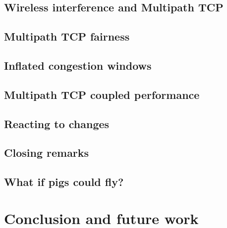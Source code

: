 \documentclass[12pt,a4paper]{article}
\begin{document}
\subsection{Wireless interference and Multipath TCP}
\label{sec:results-mptcp}

\FloatBarrier
\clearpage
\subsection{Multipath TCP fairness}
\label{sec:results-fairness}

\FloatBarrier
\clearpage
\subsection{Inflated congestion windows}
\label{sec:results-inflated}

\FloatBarrier
\clearpage
\subsection{Multipath TCP coupled performance}
\label{sec:results-performance}

\FloatBarrier
\clearpage
\subsection{Reacting to changes}
\label{sec:results-reacting}

\FloatBarrier
\clearpage
\subsection{Closing remarks}
\label{sec:results-closing-remarks}

\FloatBarrier

\subsection{What if pigs could fly?} %

\clearpage
\section{Conclusion and future work}
\label{sec:conclusion}

\end{document}
